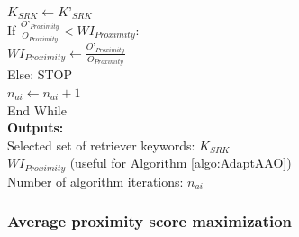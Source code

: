 \begin{algorithm}
\hspace*{10mm}               $K_{SRK} \leftarrow K\text{'}_{SRK}$ \\ 
\hspace*{10mm}                           If $\frac{O\text{'}_{Proximity}}{O_{Proximity}}  < WI_{Proximity}$:\\ 
\hspace*{14mm}        	         $WI_{Proximity} \leftarrow \frac{O\text{'}_{Proximity}}{O_{Proximity}} $ \\ 
\hspace*{6mm}               Else:  STOP \\  
\hspace*{6mm}        $n_{ai} \leftarrow n_{ai} + 1 $ \\ 
\hspace*{2mm} End While \\ 
\textbf{Outputs: } \\ 
\hspace*{2mm}Selected set of retriever keywords: $K_{SRK}$ \\ 
\hspace*{2mm}$WI_{Proximity}$ (useful for Algorithm \ref{algo:AdaptAAO}) \\
\hspace*{2mm}Number of algorithm iterations: $n_{ai}$
\end{algorithm}

\subsubsection{Average proximity score maximization }
\label{sec:aaoproxmax}

